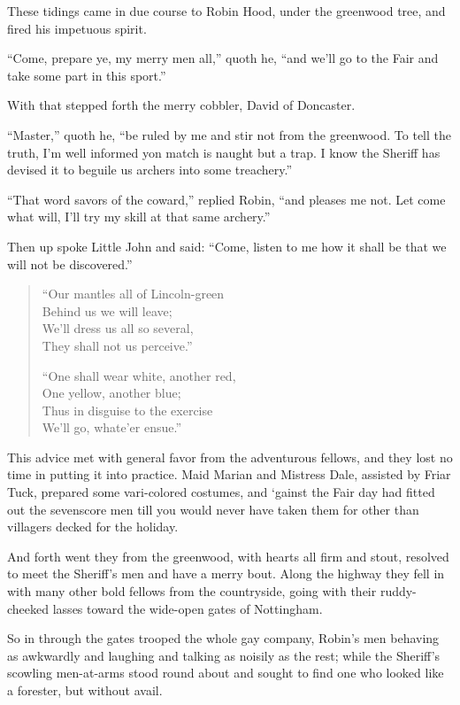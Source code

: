 These tidings came in due course to Robin Hood, under the greenwood
tree, and fired his impetuous spirit.

``Come, prepare ye, my merry men all,'' quoth he, ``and we'll go to the
Fair and take some part in this sport.''

With that stepped forth the merry cobbler, David of Doncaster.

``Master,'' quoth he, ``be ruled by me and stir not from the greenwood.
To tell the truth, I'm well informed yon match is naught but a trap. I
know the Sheriff has devised it to beguile us archers into some
treachery.''

``That word savors of the coward,'' replied Robin, ``and pleases me not.
Let come what will, I'll try my skill at that same archery.''

Then up spoke Little John and said: ``Come, listen to me how it shall be
that we will not be discovered.''

\begin{quote}
``Our mantles all of Lincoln-green\\
Behind us we will leave;\\
We'll dress us all so several,\\
They shall not us perceive.''

``One shall wear white, another red,\\
One yellow, another blue;\\
Thus in disguise to the exercise\\
We'll go, whate'er ensue.''
\end{quote}

This advice met with general favor from the adventurous fellows, and
they lost no time in putting it into practice. Maid Marian and Mistress
Dale, assisted by Friar Tuck, prepared some vari-colored costumes, and
`gainst the Fair day had fitted out the sevenscore men till you would
never have taken them for other than villagers decked for the holiday.

And forth went they from the greenwood, with hearts all firm and stout,
resolved to meet the Sheriff's men and have a merry bout. Along the
highway they fell in with many other bold fellows from the countryside,
going with their ruddy-cheeked lasses toward the wide-open gates of
Nottingham.

So in through the gates trooped the whole gay company, Robin's men
behaving as awkwardly and laughing and talking as noisily as the rest;
while the Sheriff's scowling men-at-arms stood round about and sought to
find one who looked like a forester, but without avail.

